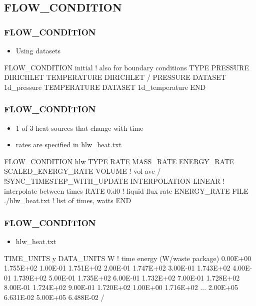 \documentclass{beamer}
\newcommand\redcomment[1]{{{\color{red} #1}}}
\newcommand\bluecomment[1]{{{\color{blue} #1}}}
\newcommand\greencomment[1]{{{\color{green} #1}}}
\begin{document}
\subsection{FLOW\_CONDITION}

\begin{frame}[fragile]\frametitle{FLOW\_CONDITION}
\begin{itemize}
  \item{Using \redcomment{datasets}}
\end{itemize}

\begin{semiverbatim}
FLOW_CONDITION initial \bluecomment{! also for boundary conditions}
  TYPE
    PRESSURE DIRICHLET
    TEMPERATURE DIRICHLET
  /
  PRESSURE DATASET 1d_pressure
  TEMPERATURE DATASET 1d_temperature
END

\end{semiverbatim}
\end{frame}

\begin{frame}[fragile]\frametitle{FLOW\_CONDITION}
\begin{itemize}
  \item{1 of 3 heat \redcomment{sources} that change with time}
  \item{rates are specified in \greencomment{hlw\_heat.txt}}
\end{itemize}

\begin{semiverbatim}
FLOW_CONDITION hlw
  TYPE
    RATE MASS_RATE
    ENERGY_RATE SCALED_ENERGY_RATE VOLUME \bluecomment{! vol ave}
  /
  \bluecomment{!SYNC_TIMESTEP_WITH_UPDATE}
  INTERPOLATION LINEAR \bluecomment{! interpolate between times}
  RATE 0.d0 \bluecomment{! liquid flux rate}
  ENERGY_RATE FILE ./hlw_heat.txt \bluecomment{! list of times, watts}
END

\end{semiverbatim}
\end{frame}

\begin{frame}[fragile]\frametitle{FLOW\_CONDITION}
\begin{itemize}
  \item{\greencomment{hlw\_heat.txt}}
\end{itemize}

\begin{semiverbatim}\small
TIME_UNITS y
DATA_UNITS W
\bluecomment{! time energy (W/waste package)}
0.00E+00        1.755E+02
1.00E-01        1.751E+02
2.00E-01        1.747E+02
3.00E-01        1.743E+02
4.00E-01        1.739E+02
5.00E-01        1.735E+02
6.00E-01        1.732E+02
7.00E-01        1.728E+02
8.00E-01        1.724E+02
9.00E-01        1.720E+02
1.00E+00        1.716E+02
\bluecomment{...}
2.00E+05        6.631E-02
5.00E+05        6.488E-02
/
\end{semiverbatim}
\end{frame}
\end{document}
